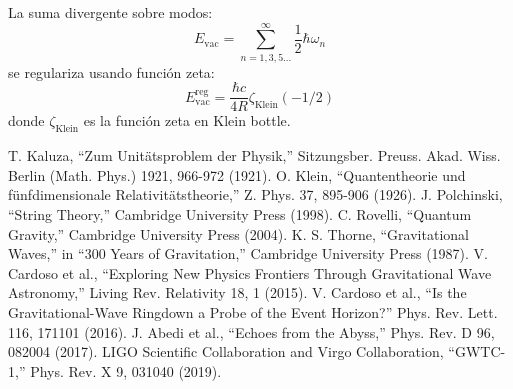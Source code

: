\documentclass[12pt,a4paper]{article}
\begin{document}
La suma divergente sobre modos:
\begin{equation}
E_\mathrm{vac} = \sum_{n=1,3,5...}^{\infty} \frac{1}{2}\hbar\omega_n
\end{equation}
se regulariza usando función zeta:
\begin{equation}
E_\mathrm{vac}^{\mathrm{reg}} = \frac{\hbar c}{4R} \zeta_\mathrm{Klein}(-1/2)
\end{equation}
donde $\zeta_\mathrm{Klein}$ es la función zeta en Klein bottle.

% 
% 

\begin{thebibliography}{10}
 T. Kaluza, ``Zum Unitätsproblem der Physik,'' Sitzungsber. Preuss. Akad. Wiss. Berlin (Math. Phys.) 1921, 966-972 (1921).
 O. Klein, ``Quantentheorie und fünfdimensionale Relativitätstheorie,'' Z. Phys. 37, 895-906 (1926).
 J. Polchinski, ``String Theory,'' Cambridge University Press (1998).
 C. Rovelli, ``Quantum Gravity,'' Cambridge University Press (2004).
 K. S. Thorne, ``Gravitational Waves,'' in ``300 Years of Gravitation,'' Cambridge University Press (1987).
 V. Cardoso et al., ``Exploring New Physics Frontiers Through Gravitational Wave Astronomy,'' Living Rev. Relativity 18, 1 (2015).
 V. Cardoso et al., ``Is the Gravitational-Wave Ringdown a Probe of the Event Horizon?'' Phys. Rev. Lett. 116, 171101 (2016).
 J. Abedi et al., ``Echoes from the Abyss,'' Phys. Rev. D 96, 082004 (2017).
 LIGO Scientific Collaboration and Virgo Collaboration, ``GWTC-1,'' Phys. Rev. X 9, 031040 (2019).
\end{thebibliography}
\end{document}
